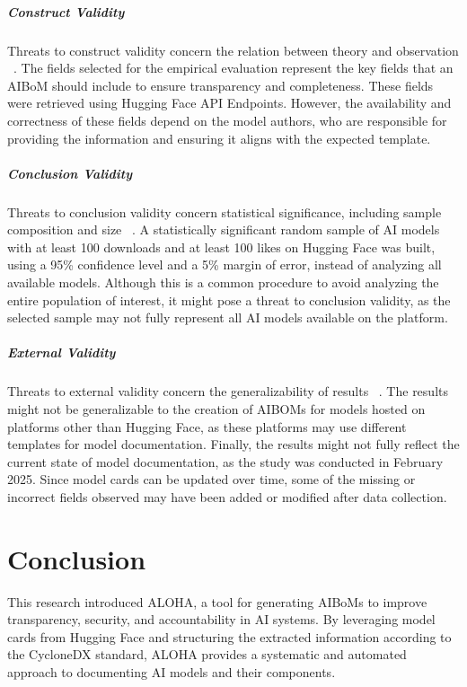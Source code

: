 \documentclass[12pt,a4paper, oneside, openright]{book}
\newcommand{\aibom}{{AIBoM}\xspace}
\newcommand{\aiboms}{{AIBoMs}\xspace}
\begin{document}
\paragraph{Construct Validity} 
Threats to construct validity concern the relation between theory and observation ~\cite{wohlin2012experimentation}. The fields selected for the empirical evaluation represent the key fields that an \aibom should include to ensure transparency and completeness. These fields were retrieved using Hugging Face API Endpoints. 
However, the availability and correctness of these fields depend on the model authors, who are responsible for providing the information and ensuring it aligns with the expected template.
\paragraph{Conclusion Validity}
Threats to conclusion validity concern statistical significance, including sample composition and size ~\cite{wohlin2012experimentation}. A statistically significant random sample of AI models with at least 100 downloads and at least 100 likes on Hugging Face was built, using a 95\% confidence level and a 5\% margin of error, instead of analyzing all available models. Although this is a common procedure to avoid analyzing the entire population of interest, it might pose a threat to conclusion validity, as the selected sample may not fully represent all AI models available on the platform.
\paragraph{External Validity} 
Threats to external validity concern the generalizability of results ~\cite{wohlin2012experimentation}. The results might not be generalizable to the creation of AIBOMs for models hosted on platforms other than Hugging Face, as these platforms may use different templates for model documentation. Finally, the results might not fully reflect the current state of model documentation, as the study was conducted in February 2025. Since model cards can be updated over time, some of the missing or incorrect fields observed may have been added or modified after data collection.

\chapter{Conclusion}
This research introduced ALOHA, a tool for generating \aiboms to improve transparency, security, and accountability in AI systems. 
By leveraging model cards from Hugging Face and structuring the extracted information according to the CycloneDX standard, ALOHA provides a systematic and automated approach to documenting AI models and their components.
\end{document}
